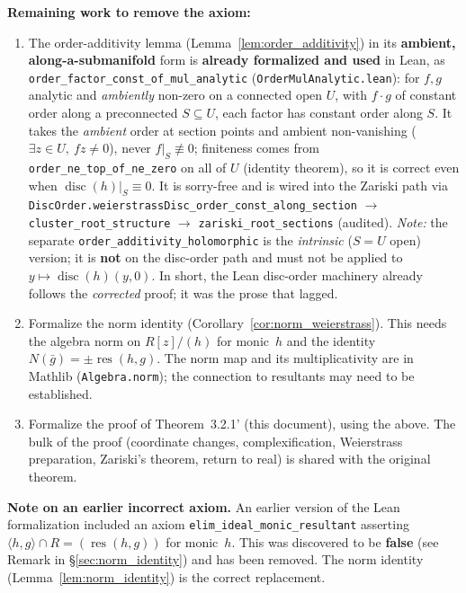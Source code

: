 \documentclass[11pt]{article}
\theoremstyle{plain}
\theoremstyle{definition}
\DeclareMathOperator{\res}{res}
\DeclareMathOperator{\disc}{disc}
\begin{document}
\noindent
\textbf{Remaining work to remove the axiom:}
\begin{enumerate}
\item The order-additivity lemma (Lemma~\ref{lem:order_additivity}) in its
  \textbf{ambient, along-a-submanifold} form is \textbf{already formalized and
  used} in Lean, as \texttt{order\_factor\_const\_of\_mul\_analytic}
  (\texttt{OrderMulAnalytic.lean}): for $f,g$ analytic and \emph{ambiently}
  non-zero on a connected open $U$, with $f\cdot g$ of constant order along a
  preconnected $S \subseteq U$, each factor has constant order along $S$.  It
  takes the \emph{ambient} order at section points and ambient non-vanishing
  ($\exists z \in U,\ f z \ne 0$), never $f|_S \not\equiv 0$; finiteness comes
  from \texttt{order\_ne\_top\_of\_ne\_zero} on all of $U$ (identity theorem),
  so it is correct even when $\disc(h)|_S \equiv 0$.  It is sorry-free and is
  wired into the Zariski path via
  \texttt{DiscOrder.weierstrassDisc\_order\_const\_along\_section} $\to$
  \texttt{cluster\_root\_structure} $\to$ \texttt{zariski\_root\_sections}
  (audited).  \emph{Note:} the separate \texttt{order\_additivity\_holomorphic}
  is the \emph{intrinsic} ($S = U$ open) version; it is \textbf{not} on the
  disc-order path and must not be applied to $y \mapsto \disc(h)(y,0)$.  In
  short, the Lean disc-order machinery already follows the \emph{corrected}
  proof; it was the prose that lagged.
\item Formalize the norm identity (Corollary~\ref{cor:norm_weierstrass}).
  This needs the algebra norm on $R[z]/(h)$ for monic~$h$ and the identity
  $N(\bar{g}) = \pm\res(h,g)$.  The norm map and its multiplicativity are
  in Mathlib (\texttt{Algebra.norm}); the connection to resultants may
  need to be established.
\item Formalize the proof of Theorem~3.2.1' (this document), using the
  above.  The bulk of the proof (coordinate changes, complexification,
  Weierstrass preparation, Zariski's theorem, return to real) is shared
  with the original theorem.
\end{enumerate}

\noindent
\textbf{Note on an earlier incorrect axiom.}
An earlier version of the Lean formalization included an axiom
\texttt{elim\_ideal\_monic\_resultant} asserting
$\langle h, g \rangle \cap R = (\res(h,g))$ for monic~$h$.
This was discovered to be \textbf{false} (see
Remark in \S\ref{sec:norm_identity}) and has been removed.  The norm
identity (Lemma~\ref{lem:norm_identity}) is the correct replacement.
\end{document}
